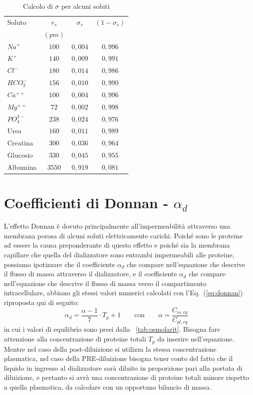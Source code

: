 \begin{table}[htb]
	\centering
	\caption{Calcolo di $\sigma$ per alcuni soluti}\label{tab:staverman}
		\begin{tabular}{lccc}
\toprule
Soluto      & $r_s$  & $\sigma_s$ & $(1-\sigma_s)$ \\
            & $(pm)$ &            &                \\
\midrule
$Na^+$      & $100$  & $0,004$      & $0,996$      \\
$K^+$       & $140$  & $0,009$      & $0,991$      \\
$Cl^-$      & $180$  & $0,014$      & $0,986$      \\
$HCO_3^-$   & $156$  & $0,010$      & $0,990$      \\
$Ca^{++}$   & $100$  & $0,004$      & $0,996$      \\
$Mg^{++}$   &{ }$72$ & $0,002$      & $0,998$      \\
$PO_4^{3-}$ & $238$  & $0,024$      & $0,976$      \\
Urea        & $160$  & $0,011$      & $0,989$      \\
Creatina    & $300$  & $0,036$      & $0,964$      \\
Glucosio    & $330$  & $0,045$      & $0,955$      \\
Albumina    &$3550$  & $0,919$      & $0,081$      \\
\bottomrule
\end{tabular}
\end{table}

\section{Coefficienti di Donnan - $\alpha_d$}
L'effetto Donnan è dovuto principalmente all'impermeabilità attraverso una membrana porosa di alcuni soluti elettricamente carichi. Poiché sono le proteine ad essere la causa preponderante di questo effetto e poiché sia la membrana capillare che quella del dializzatore sono entrambi impermeabili alle proteine, possiamo ipotizzare che il coefficiente $\alpha_d$ che compare nell'equazione che descrive il flusso di massa attraverso il dializzatore, e il coefficiente $\alpha_d$ che compare nell'equazione che descrive il flusso di massa verso il compartimento intracellulare, abbiano gli stessi valori numerici calcolati con l'Eq.~(\ref{eq:donnan}) riproposta qui di seguito:
\begin{equation}
	\alpha_d = \frac{\alpha-1}{7} \cdot T_p + 1 \qquad \text{con} \qquad \alpha=\frac{C_{is,eq}}{C_{pl,eq}}
\end{equation}
in cui i valori di equilibrio sono presi dalla \tablename~\ref{tab:osmolarit}. Bisogna fare attenzione alla concentrazione di proteine totali $T_p$ da inserire nell'equazione. Mentre nel caso della post-diluizione si utilizza la stessa concentrazione plasmatica, nel caso della PRE-diluizione bisogna tener conto del fatto che il liquido in ingresso al dializzatore sarà diluito in proporzione pari alla portata di diluizione, e pertanto si avrà una concentrazione di proteine totali minore rispetto a quella plasmatica, da calcolare con un opportuno bilancio di massa.


